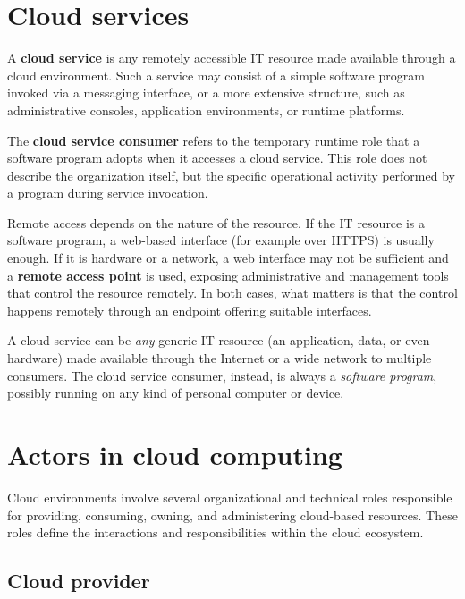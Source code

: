 \section{Cloud services}

A \textbf{cloud service} is any remotely accessible IT resource made available through a cloud environment. Such a service may consist of a simple software program invoked via a messaging interface, or a more extensive structure, such as administrative consoles, application environments, or runtime platforms.

The \textbf{cloud service consumer} refers to the temporary runtime role that a software program adopts when it accesses a cloud service. This role does not describe the organization itself, but the specific operational activity performed by a program during service invocation.

Remote access depends on the nature of the resource. If the IT resource is a software program, a web-based interface (for example over HTTPS) is usually enough. If it is hardware or a network, a web interface may not be sufficient and a \textbf{remote access point} is used, exposing administrative and management tools that control the resource remotely. In both cases, what matters is that the control happens remotely through an endpoint offering suitable interfaces.

\begin{notebox}
	A cloud service can be \emph{any} generic IT resource (an application, data, or even hardware) made available through the Internet or a wide network to multiple consumers. The cloud service consumer, instead, is always a \emph{software program}, possibly running on any kind of personal computer or device.
\end{notebox}

\section{Actors in cloud computing}

Cloud environments involve several organizational and technical roles responsible for providing, consuming, owning, and administering cloud-based resources. These roles define the interactions and responsibilities within the cloud ecosystem.

\subsection{Cloud provider}

